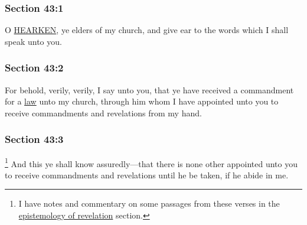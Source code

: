 	\subsubsection{Section 43:1} %
		\label{DC43-1}

		O \hyperref[HEARKEN]{HEARKEN}, ye elders of my church, and give ear to the words which I shall speak unto you.


	\subsubsection{Section 43:2} %
		\label{DC43-2}

		For behold, verily, verily, I say unto you, that ye have received a commandment for a \hyperref[LAW]{law} unto my church, through him whom I have appointed unto you to receive commandments and revelations from my hand.


	\subsubsection{Section 43:3} %
		\label{DC43-3}

			\footnote{%
				I have notes and commentary on some passages from these verses in the \hyperref[EPIST-REVELATION-DC]{epistemology of revelation} section.
				}%
		And this ye shall know assuredly---that there is none other appointed unto you to receive commandments and revelations until he be taken, if he abide in me.


